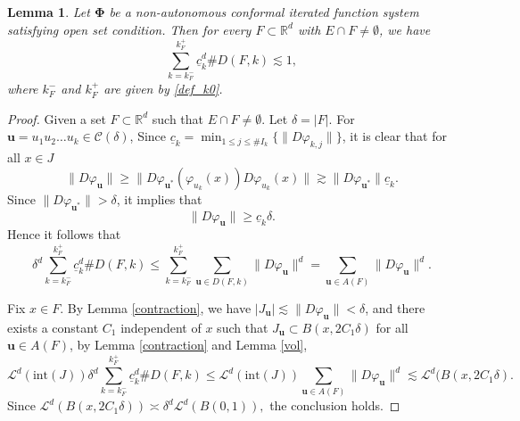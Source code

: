 \documentclass[12pt]{amsart}
\theoremstyle{plain}
\newtheorem{lem}[thm]{Lemma}
\theoremstyle{definition}
\theoremstyle{remark}
\newcommand{\bu}{\mathbf{u}}
\begin{document}
\begin{lem}\label{finite intersection}
Let $\boldsymbol{\Phi}$ be a non-autonomous conformal iterated function system satisfying open set condition. Then for every  $F \subset \mathbb{R}^d$ with  $E\cap F\ne \emptyset$, we have
$$
\sum_{k = k_F^-}^{k_F^+}\underline c_k^d\# D(F, k)\lesssim 1,
$$
where $k_F^-$ and $k_F^+$ are given by \eqref{def_k0}.
\end{lem}

\begin{proof}
Given a set $F \subset \mathbb{R}^d$ such that   $E\cap F\ne \emptyset$. Let $\delta=|F|$. For   $\bu=u_1u_2\ldots u_k\in \mathcal{C}(\delta) $, Since $\underline c_k=\min_{1\le j \le \# I_k} \{\|D\varphi_{k, j}\|\}$,  it is clear that for all $x\in J$ 
$$
\|D\varphi_\mathbf{u}\|\ge  \|D\varphi_{\mathbf{u}^*}(\varphi_{u_k}(x))D\varphi_{u_k}(x)\|  \gtrsim\|D\varphi_{\mathbf{u}^*}\|\underline c_k.
$$
Since $\|D\varphi_{\mathbf{u}^*}\|> \delta$, it implies that 
\begin{equation}\label{DckD}
\|D\varphi_\mathbf{u}\|\ge \underline c_k\delta.
\end{equation} 
Hence it follows that 
$$
\delta ^d\sum_{k = k_F^-}^{k_F^+}\underline c_k^d\# D(F, k) \le\sum_{k = k_F^-}^{k_F^+}\sum_{\mathbf{u} \in D(F, k)} \|D\varphi_\mathbf{u}\|^d=\sum_{\mathbf{u} \in A(F)} \|D\varphi_\mathbf{u}\|^d  . 
$$

Fix $x\in F$. By Lemma \ref{contraction}, we have $|J_\bu|\lesssim\|D\varphi_\bu\|<\delta$, and there exists a constant $C_1$ independent of $x$ such that $J_\mathbf{u} \subset B(x,2C_1\delta)$ for all $ \mathbf{u} \in A(F)$,   by Lemma \ref{contraction} and Lemma \ref{vol}, 
$$
 \mathcal{L}^d(\mbox{int}(J))\delta ^d\sum_{k = k_F^-}^{k_F^+}\underline c_k^d\# D(F, k)\le \mathcal{L}^d(\mbox{int}(J)) \sum_{\mathbf{u} \in A(F)} \|D\varphi_\mathbf{u}\|^d  \lesssim   \mathcal{L}^d(B(x,2C_1\delta).
$$
Since  $\mathcal{L}^d(B(x,2C_1\delta))\asymp \delta^d  \mathcal{L}^d(B(0,1)), $   the conclusion holds.
\end{proof}
\end{document}
